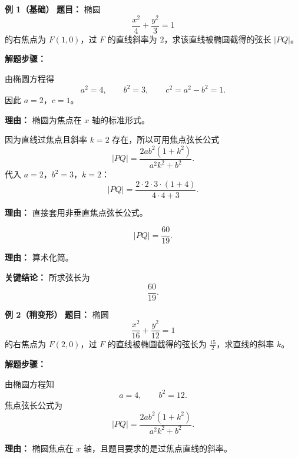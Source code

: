 \begin{examplebox}
	\textbf{\textcolor{CExample}{例 1（基础）}}
	\textbf{\textcolor{CExample}{题目：}}
	椭圆
	\[
		\frac{x^2}{4}+\frac{y^2}{3}=1
	\]
	的右焦点为 $F(1,0)$，过 $F$ 的直线斜率为 $2$，求该直线被椭圆截得的弦长 $|PQ|$。

	\textbf{\textcolor{CExample}{解题步骤：}}

	\begin{description}[style=nextline, leftmargin=2.8em, labelsep=0.5em, itemsep=0.45em]
		\item[\textbf{第一步（识别参数）：}]
		      由椭圆方程得
		      \[
			      a^2=4,\qquad b^2=3,\qquad c^2=a^2-b^2=1.
		      \]
		      因此 $a=2$，$c=1$。
		      \par\textbf{理由：}
		      椭圆为焦点在 $x$ 轴的标准形式。

		\item[\textbf{第二步（代入公式）：}]
		      因为直线过焦点且斜率 $k=2$ 存在，所以可用焦点弦长公式
		      \[
			      |PQ|=\frac{2ab^2(1+k^2)}{a^2k^2+b^2}.
		      \]
		      代入 $a=2$，$b^2=3$，$k=2$：
		      \[
			      |PQ|=\frac{2\cdot2\cdot3\cdot(1+4)}{4\cdot4+3}.
		      \]
		      \par\textbf{理由：}
		      直接套用非垂直焦点弦长公式。

		\item[\textbf{第三步（计算结果）：}]
		      \[
			      |PQ|=\frac{60}{19}.
		      \]
		      \par\textbf{理由：}
		      算术化简。
	\end{description}

	\textbf{\textcolor{CExample}{关键结论：}}
	所求弦长为
	\[
		\boxed{\frac{60}{19}}.
	\]

	\medskip

	\textbf{\textcolor{CExample}{例 2（稍变形）}}
	\textbf{\textcolor{CExample}{题目：}}
	椭圆
	\[
		\frac{x^2}{16}+\frac{y^2}{12}=1
	\]
	的右焦点为 $F(2,0)$，过 $F$ 的直线被椭圆截得的弦长为 $\frac{15}{2}$，求直线的斜率 $k$。

	\textbf{\textcolor{CExample}{解题步骤：}}

	\begin{description}[style=nextline, leftmargin=2.8em, labelsep=0.5em, itemsep=0.45em]
		\item[\textbf{第一步（写出公式）：}]
		      由椭圆方程知
		      \[
			      a=4,\qquad b^2=12.
		      \]
		      焦点弦长公式为
		      \[
			      |PQ|=\frac{2ab^2(1+k^2)}{a^2k^2+b^2}.
		      \]
		      \par\textbf{理由：}
		      椭圆焦点在 $x$ 轴，且题目要求的是过焦点直线的斜率。


\end{description}
\end{examplebox}
